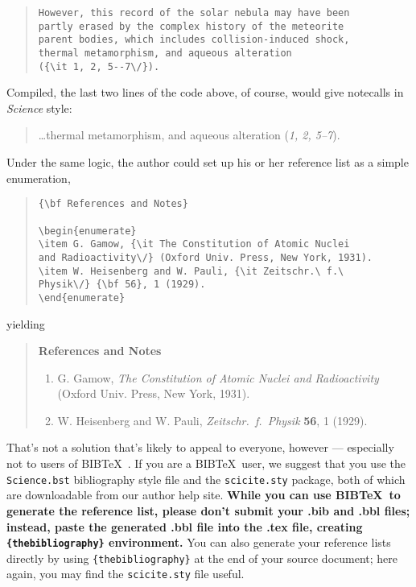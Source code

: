 \documentclass[12pt]{article}
\begin{document}
\begin{quote}
\begin{verbatim}
However, this record of the solar nebula may have been
partly erased by the complex history of the meteorite
parent bodies, which includes collision-induced shock,
thermal metamorphism, and aqueous alteration
({\it 1, 2, 5--7\/}).
\end{verbatim}
\end{quote}


\noindent Compiled, the last two lines of the code above, of course, would give notecalls in {\it Science\/} style:

\begin{quote}
\ldots thermal metamorphism, and aqueous alteration ({\it 1, 2, 5--7\/}).
\end{quote}

Under the same logic, the author could set up his or her reference list as a simple enumeration,

\begin{quote}
\begin{verbatim}
{\bf References and Notes}

\begin{enumerate}
\item G. Gamow, {\it The Constitution of Atomic Nuclei
and Radioactivity\/} (Oxford Univ. Press, New York, 1931).
\item W. Heisenberg and W. Pauli, {\it Zeitschr.\ f.\ 
Physik\/} {\bf 56}, 1 (1929).
\end{enumerate}
\end{verbatim}
\end{quote}

\noindent yielding

\begin{quote}
{\bf References and Notes}

\begin{enumerate}
\item G. Gamow, {\it The Constitution of Atomic Nuclei and
Radioactivity\/} (Oxford Univ. Press, New York, 1931).
\item W. Heisenberg and W. Pauli, {\it Zeitschr.\ f.\ Physik} {\bf 56},
1 (1929).
\end{enumerate}
\end{quote}


That's not a solution that's likely to appeal to everyone, however ---
especially not to users of B{\small{IB}}\TeX\ \cite{inclme}.  If you
are a B{\small{IB}}\TeX\ user, we suggest that you use the
\texttt{Science.bst} bibliography style file and the
\texttt{scicite.sty} package, both of which are downloadable from our author help site.
{\bf While you can use B{\small{IB}}\TeX\ to generate the reference list, please don't submit 
your .bib and .bbl files; instead, paste the generated .bbl file into the .tex file, creating
 \texttt{\{thebibliography\}} environment.}
 You can also
generate your reference lists directly by using 
\texttt{\{thebibliography\}} at the end of your source document; here
again, you may find the \texttt{scicite.sty} file useful.
\end{document}
